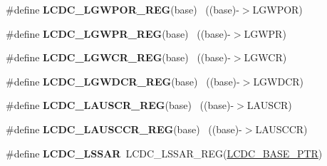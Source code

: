 \begin{DoxyCompactItemize}
\item 
\hypertarget{group___l_c_d_c___register___accessor___macros_gaf572f8e16d72683f90407e1ef06e546f}{}\#define {\bfseries L\+C\+D\+C\+\_\+\+L\+G\+W\+P\+O\+R\+\_\+\+R\+E\+G}(base)                                    ~((base)-\/$>$L\+G\+W\+P\+O\+R)\label{group___l_c_d_c___register___accessor___macros_gaf572f8e16d72683f90407e1ef06e546f}

\item 
\hypertarget{group___l_c_d_c___register___accessor___macros_gaee5929964035f3544fc986cf106130f2}{}\#define {\bfseries L\+C\+D\+C\+\_\+\+L\+G\+W\+P\+R\+\_\+\+R\+E\+G}(base)                                      ~((base)-\/$>$L\+G\+W\+P\+R)\label{group___l_c_d_c___register___accessor___macros_gaee5929964035f3544fc986cf106130f2}

\item 
\hypertarget{group___l_c_d_c___register___accessor___macros_gaaa9bc31aba3bb71cb9d8cf23c3d75b92}{}\#define {\bfseries L\+C\+D\+C\+\_\+\+L\+G\+W\+C\+R\+\_\+\+R\+E\+G}(base)                                      ~((base)-\/$>$L\+G\+W\+C\+R)\label{group___l_c_d_c___register___accessor___macros_gaaa9bc31aba3bb71cb9d8cf23c3d75b92}

\item 
\hypertarget{group___l_c_d_c___register___accessor___macros_ga9d56b1209094496eec245d2c2a64e78f}{}\#define {\bfseries L\+C\+D\+C\+\_\+\+L\+G\+W\+D\+C\+R\+\_\+\+R\+E\+G}(base)                                    ~((base)-\/$>$L\+G\+W\+D\+C\+R)\label{group___l_c_d_c___register___accessor___macros_ga9d56b1209094496eec245d2c2a64e78f}

\item 
\hypertarget{group___l_c_d_c___register___accessor___macros_gad904979d07ce77aef13ba730827290be}{}\#define {\bfseries L\+C\+D\+C\+\_\+\+L\+A\+U\+S\+C\+R\+\_\+\+R\+E\+G}(base)                                    ~((base)-\/$>$L\+A\+U\+S\+C\+R)\label{group___l_c_d_c___register___accessor___macros_gad904979d07ce77aef13ba730827290be}

\item 
\hypertarget{group___l_c_d_c___register___accessor___macros_gacd4346777ae06570ce42682a533543ff}{}\#define {\bfseries L\+C\+D\+C\+\_\+\+L\+A\+U\+S\+C\+C\+R\+\_\+\+R\+E\+G}(base)                                  ~((base)-\/$>$L\+A\+U\+S\+C\+C\+R)\label{group___l_c_d_c___register___accessor___macros_gacd4346777ae06570ce42682a533543ff}

\item 
\hypertarget{group___l_c_d_c___register___accessor___macros_gad67f59b66f24c77a14f7dbb7a128e579}{}\#define {\bfseries L\+C\+D\+C\+\_\+\+L\+S\+S\+A\+R}~L\+C\+D\+C\+\_\+\+L\+S\+S\+A\+R\+\_\+\+R\+E\+G(\hyperlink{group___l_c_d_c___peripheral_ga87dd9b3292c2c039290038a24dda01c4}{L\+C\+D\+C\+\_\+\+B\+A\+S\+E\+\_\+\+P\+T\+R})\label{group___l_c_d_c___register___accessor___macros_gad67f59b66f24c77a14f7dbb7a128e579}


\end{DoxyCompactItemize}
